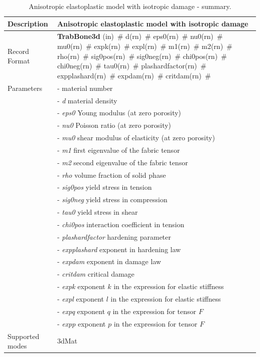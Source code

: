 \documentclass[a4paper]{article}
\newcommand{\mbf}[1]{\mbox{\boldmath$#1$}}
\newcommand{\descitem}[1]{{\noindent \bf #1}}
\newcommand{\elemparam}[2]{{{#1\tiny (#2)}~\#}}
\newcommand{\param}[1]{{\it #1}}
\begin{document}
\begin{table}[!htb]
\begin{tabular}{|l|p{9cm}|}
\hline
Description & Anisotropic elastoplastic model with isotropic damage\\
\hline
Record Format & \descitem{TrabBone3d}  \elemparam{}{in}
\elemparam{d}{rn} \elemparam{eps0}{rn} \elemparam{nu0}{rn} \elemparam{mu0}{rn} \elemparam{expk}{rn} \elemparam{expl}{rn} \elemparam{m1}{rn} \elemparam{m2}{rn} \elemparam{rho}{rn}
\elemparam{sig0pos}{rn} \elemparam{sig0neg}{rn} \elemparam{chi0pos}{rn} \elemparam{chi0neg}{rn} \elemparam{tau0}{rn} \elemparam{plashardfactor}{rn} \elemparam{expplashard}{rn} \elemparam{expdam}{rn} \elemparam{critdam}{rn}\\
Parameters &- \param{} material number\\
&- \param{d} material density\\
&- \param{eps0} Young modulus (at zero porosity)\\
&- \param{nu0} Poisson ratio (at zero porosity)\\
&- \param{mu0} shear modulus of elasticity (at zero porosity)\\
&- \param{m1} first eigenvalue of the fabric tensor\\
&- \param{m2} second eigenvalue of the fabric tensor\\
&- \param{rho} volume fraction of solid phase\\
&- \param{sig0pos} yield stress in tension\\
&- \param{sig0neg} yield stress in compression\\
&- \param{tau0} yield stress in shear\\
&- \param{chi0pos} interaction coefficient in tension\\
&- \param{plashardfactor} hardening parameter\\
&- \param{expplashard} exponent in hardening law\\
&- \param{expdam} exponent in damage law\\
&- \param{critdam} critical damage\\
&- \param{expk} exponent $k$ in the expression for elastic stiffness\\
&- \param{expl} exponent $l$ in the expression for elastic stiffness\\
&- \param{expq} exponent $q$ in the expression for tensor \mbf{F}\\
&- \param{expp} exponent $p$ in the expression for tensor \mbf{F}\\
Supported modes& 3dMat\\
\hline
\end{tabular}
\caption{Anisotropic elastoplastic model with isotropic damage - summary.}
\label{trabbone_table}
\end{table}
\end{document}
